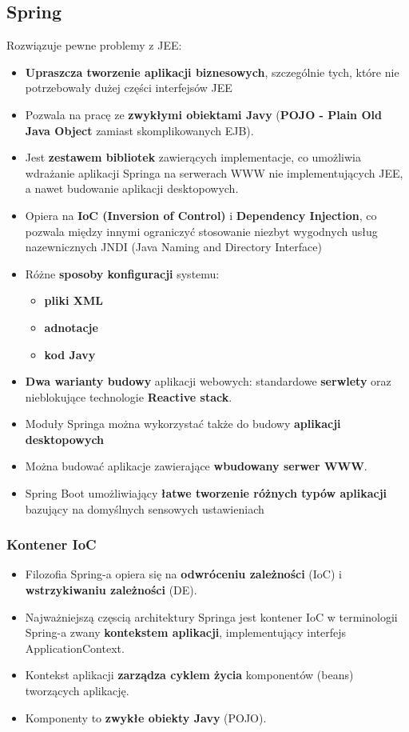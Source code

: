\documentclass[../main.tex]{subfiles}
\begin{document}
    \subsection{Spring}
    Rozwiązuje pewne problemy z JEE:
    \begin{itemize}
        \item \textbf{Upraszcza tworzenie aplikacji biznesowych}, szczególnie tych, które nie
        potrzebowały dużej części interfejsów JEE
        \item Pozwala na pracę ze \textbf{zwykłymi obiektami Javy} (\textbf{POJO - Plain Old Java
        Object} zamiast skomplikowanych EJB).
        \item Jest \textbf{zestawem bibliotek} zawierących implementacje, co umożliwia
        wdrażanie aplikacji Springa na serwerach WWW nie implementujących
        JEE, a nawet budowanie aplikacji desktopowych.
        \item Opiera na \textbf{IoC (Inversion of Control)} i \textbf{Dependency Injection}, co
        pozwala między innymi ograniczyć stosowanie niezbyt wygodnych usług
        nazewnicznych JNDI (Java Naming and Directory Interface)
        \item Różne \textbf{sposoby konfiguracji} systemu:
        \begin{itemize}
            \item \textbf{pliki XML}
            \item \textbf{adnotacje}
            \item \textbf{kod Javy}
        \end{itemize}
        \item \textbf{Dwa warianty budowy} aplikacji webowych: standardowe \textbf{serwlety} oraz nieblokujące technologie \textbf{Reactive stack}.
        \item Moduły Springa można wykorzystać także do budowy \textbf{aplikacji desktopowych}
        \item Można budować aplikacje zawierające \textbf{wbudowany serwer WWW}.
        \item Spring Boot umożliwiający \textbf{łatwe tworzenie różnych typów aplikacji} bazujący
        na domyślnych sensowych ustawieniach
    \end{itemize}

    \subsubsection{Kontener IoC}
    \begin{itemize}
        \item Filozofia Spring-a opiera się na \textbf{odwróceniu zależności} (IoC) i \textbf{wstrzykiwaniu
        zależności} (DE).
        \item Najważniejszą częscią architektury Springa jest kontener IoC w
        terminologii Spring-a zwany \textbf{kontekstem aplikacji}, implementujący interfejs
        ApplicationContext.
        \item Kontekst aplikacji \textbf{zarządza cyklem życia} komponentów (beans) tworzących
        aplikację.
        \item Komponenty to \textbf{zwykłe obiekty Javy} (POJO).
    \end{itemize}
\end{document}
